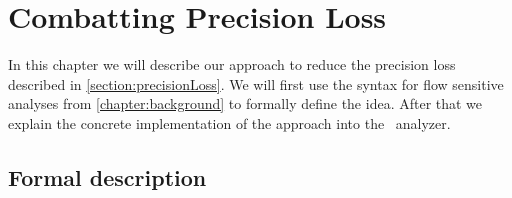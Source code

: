 
\chapter{Combatting Precision Loss}\label{chapter:mainContributions}
  In this chapter we will describe our approach to reduce the precision loss described in \autoref{section:precisionLoss}. We will first use the syntax for flow sensitive analyses from \autoref{chapter:background} to formally define the idea. After that we explain the concrete implementation of the approach into the \gob\ analyzer.
  \section{Formal description}
